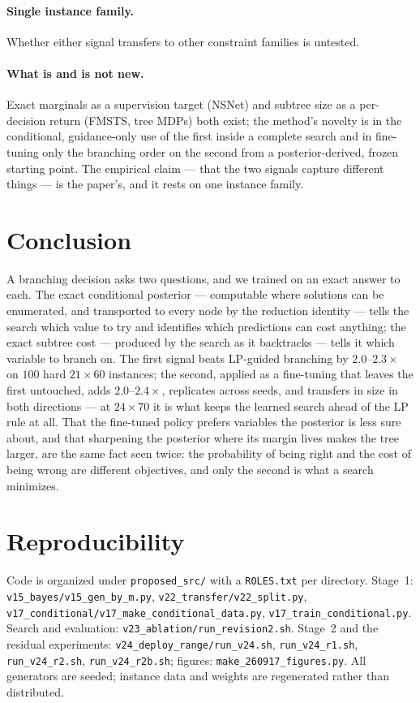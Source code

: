 \documentclass[final,5p,times,twocolumn]{elsarticle}
\begin{document}
\paragraph{Single instance family.} Whether either signal transfers to other constraint families is untested.

\paragraph{What is and is not new.} Exact marginals as a supervision target (NSNet) and subtree size as a per-decision return (FMSTS, tree MDPs) both exist; the method's novelty is in the conditional, guidance-only use of the first inside a complete search and in fine-tuning only the branching order on the second from a posterior-derived, frozen starting point. The empirical claim --- that the two signals capture different things --- is the paper's, and it rests on one instance family.

\section{Conclusion}
\label{sec:conclusion}

A branching decision asks two questions, and we trained on an exact answer to each. The exact conditional posterior --- computable where solutions can be enumerated, and transported to every node by the reduction identity --- tells the search which value to try and identifies which predictions can cost anything; the exact subtree cost --- produced by the search as it backtracks --- tells it which variable to branch on. The first signal beats LP-guided branching by $2.0$--$2.3\times$ on $100$ hard $21\times60$ instances; the second, applied as a fine-tuning that leaves the first untouched, adds $2.0$--$2.4\times$, replicates across seeds, and transfers in size in both directions --- at $24\times70$ it is what keeps the learned search ahead of the LP rule at all. That the fine-tuned policy prefers variables the posterior is less sure about, and that sharpening the posterior where its margin lives makes the tree larger, are the same fact seen twice: the probability of being right and the cost of being wrong are different objectives, and only the second is what a search minimizes.

\section*{Reproducibility}
Code is organized under \texttt{proposed\_src/} with a \texttt{ROLES.txt} per directory. Stage~1: \texttt{v15\_bayes/v15\_gen\_by\_m.py}, \texttt{v22\_transfer/v22\_split.py}, \texttt{v17\_conditional/v17\_make\_conditional\_data.py}, \texttt{v17\_train\_conditional.py}. Search and evaluation: \texttt{v23\_ablation/run\_revision2.sh}. Stage~2 and the residual experiments: \texttt{v24\_deploy\_range/run\_v24.sh}, \texttt{run\_v24\_r1.sh}, \texttt{run\_v24\_r2.sh}, \texttt{run\_v24\_r2b.sh}; figures: \texttt{make\_260917\_figures.py}. All generators are seeded; instance data and weights are regenerated rather than distributed.
\end{document}
